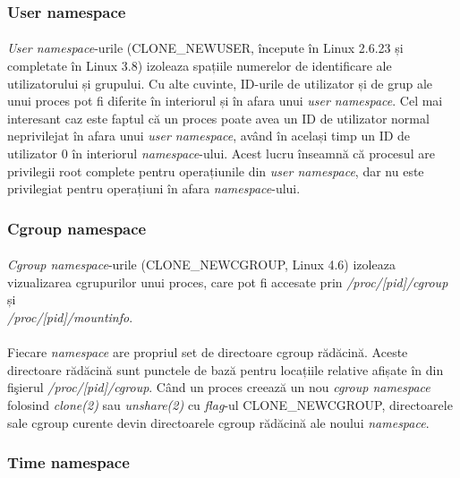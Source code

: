         \subsubsection{User namespace}
            \paragraph{} \textit{User namespace}-urile (CLONE\_NEWUSER, începute în Linux 2.6.23 și completate în Linux 3.8) izoleaza spațiile numerelor de identificare ale utilizatorului și grupului. Cu alte cuvinte, ID-urile de utilizator și de grup ale unui proces pot fi diferite în interiorul și în afara unui \textit{user namespace}. Cel mai interesant caz este faptul că un proces poate avea un ID de utilizator normal neprivilejat în afara unui \textit{user namespace}, având în același timp un ID de utilizator 0 în interiorul \textit{namespace}-ului. Acest lucru înseamnă că procesul are privilegii root complete pentru operațiunile din \textit{user namespace}, dar nu este privilegiat pentru operațiuni în afara \textit{namespace}-ului. \cite{ns:lwn}

        \subsubsection{Cgroup namespace}
            \paragraph{} \textit{Cgroup namespace}-urile (CLONE\_NEWCGROUP, Linux 4.6) izoleaza vizualizarea cgrupurilor unui proces, care pot fi accesate prin \textit{/proc/[pid]/cgroup} și \\ \textit{/proc/[pid]/mountinfo}. \cite{ns:cgroup}
            \paragraph{} Fiecare \textit{namespace} are propriul set de directoare cgroup rădăcină. Aceste directoare rădăcină sunt punctele de bază pentru locațiile relative afișate în din fişierul \textit{/proc/[pid]/cgroup}. Când un proces creează un nou \textit{cgroup namespace} folosind \textit{clone(2)} sau \textit{unshare(2)} cu \textit{flag}-ul CLONE\_NEWCGROUP, directoarele sale cgroup curente devin directoarele cgroup rădăcină ale noului \textit{namespace}. \cite{ns:cgroup}

        \subsubsection{Time namespace}
